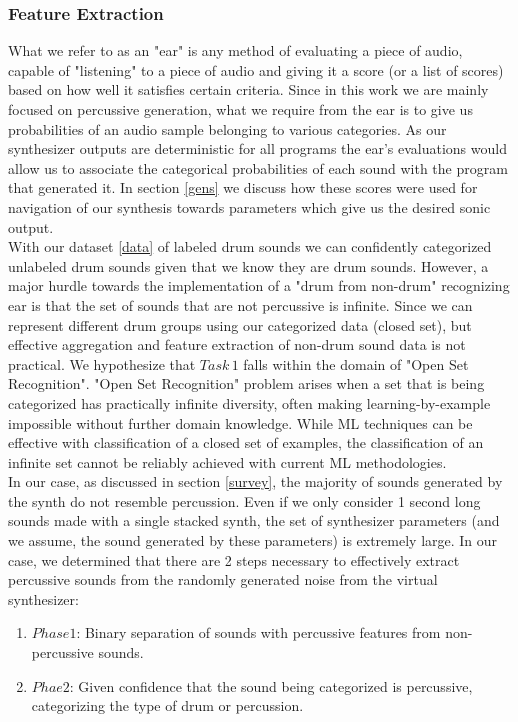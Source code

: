 \documentclass{nime-alternate} %
\begin{document}
\subsubsection{Feature Extraction}
What we refer to as an "ear" is any method of evaluating a piece of audio, capable of "listening" to a piece of audio and giving it a score (or a list of scores) based on how well it satisfies certain criteria. Since in this work we are mainly focused on percussive generation, what we require from the ear is to give us probabilities of an audio sample belonging to various categories. As our synthesizer outputs are deterministic for all programs the ear's evaluations would allow us to associate the categorical probabilities of each sound with the program that generated it. In section \ref{gens} we discuss how these scores were used for navigation of our synthesis towards parameters which give us the desired sonic output.\\
 With our dataset \ref{data} of labeled drum sounds we can confidently categorized unlabeled drum sounds given that we know they are drum sounds. However, a major hurdle towards the implementation of a "drum from non-drum" recognizing ear is that the set of sounds that are not percussive is infinite. Since we can represent different drum groups using our categorized data (closed set), but effective aggregation and feature extraction of non-drum sound data is not practical. We hypothesize that $Task\,1$ falls within the domain of "Open Set Recognition"\cite{scheirer2012toward}. "Open Set Recognition" problem arises when a set that is being categorized has practically infinite diversity, often making learning-by-example impossible without further domain knowledge. While ML techniques can be effective with classification of a closed set of examples, the classification of an infinite set cannot be reliably achieved with current ML methodologies\cite{geng2018recent,mundt2019open}. \\
  In our case, as discussed in section \ref{survey}, the majority of sounds generated by the synth do not resemble percussion. Even if we only consider 1 second long sounds made with a single stacked synth, the set of synthesizer parameters (and we assume, the sound generated by these parameters) is extremely large. In our case, we determined that there are 2 steps necessary to effectively extract percussive sounds from the randomly generated noise from the virtual synthesizer: 
  \begin{enumerate}
   \item  $Phase1$: Binary separation of sounds with percussive features from non-percussive sounds.
   \item $Phae2$: Given confidence that the sound being categorized is percussive, categorizing the type of drum or percussion.
 \end{enumerate}
\end{document}
